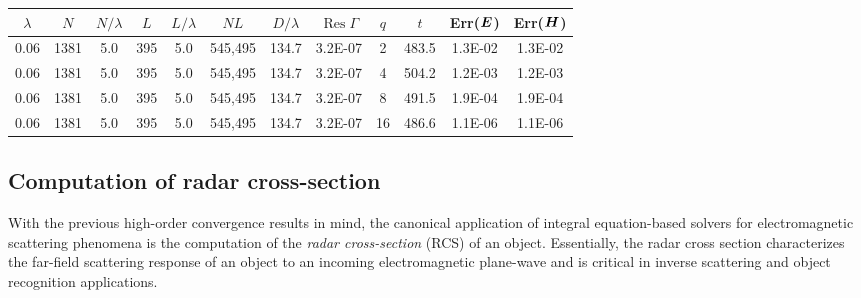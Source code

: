 \documentclass[11pt]{article}
\DeclareMathOperator{\Res}{Res}
\newcommand{\vct}{\vectorsym}
\newcommand{\bE}{\vectorsym{E}}
\newcommand{\bH}{\vct{ H}}
\numberwithin{equation}{section}
\begin{document}
\begin{table}[!b]
\begin{center}
\begin{subtable}{.9\linewidth}
{      \begin{tabular}{|c|c|c|c|c|c|c|c|c|c|c|c|} \hline
        $\lambda$ & $N$  & $N/\lambda$ & $L$ & $L/\lambda$ & $NL$
            & $D/\lambda$ & $\Res\Gamma$
            & $q$ & $t$ & Err($\bE$) & Err($\bH$) \\
        \hline\hline
        0.06 & 1381 & 5.0 & 395 & 5.0 & 545,495 & 134.7
            & 3.2E-07 & 2 &  483.5 & 1.3E-02 & 1.3E-02 \\ \hline
        0.06 & 1381 & 5.0 & 395 & 5.0 & 545,495 & 134.7
            & 3.2E-07 & 4 & 504.2 & 1.2E-03 & 1.2E-03 \\ \hline
        0.06 & 1381 & 5.0 & 395 & 5.0 & 545,495 & 134.7
            & 3.2E-07 & 8 & 491.5 & 1.9E-04 & 1.9E-04 \\ \hline
        0.06 & 1381 & 5.0 & 395 & 5.0 & 545,495 & 134.7
            & 3.2E-07 & 16 & 486.6 & 1.1E-06 & 1.1E-06 \\ \hline
      \end{tabular}
      }
    \end{subtable}
  \end{center}
\end{table}









\subsection{Computation of radar cross-section}

With the previous high-order convergence results in mind, the canonical
application of integral equation-based solvers for electromagnetic
scattering phenomena is the computation of the \emph{radar
  cross-section} (RCS) of an object. Essentially, the radar cross
section characterizes the far-field scattering response of an object
to an incoming electromagnetic plane-wave and is critical in 
inverse scattering and object recognition applications.
\end{document}
